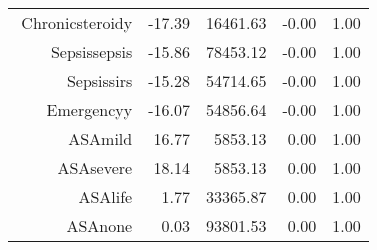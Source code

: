 \begin{tabular}{rrrrr}
$$  Chronic\-steroid\-y & -17.39 & 16461.63 & -0.00 & 1.00 \\ 
  Sepsis\-sepsis & -15.86 & 78453.12 & -0.00 & 1.00 \\ 
  Sepsis\-sirs & -15.28 & 54714.65 & -0.00 & 1.00 \\ 
  Emergency\-y & -16.07 & 54856.64 & -0.00 & 1.00 \\ 
  ASA\-mild & 16.77 & 5853.13 & 0.00 & 1.00 \\ 
  ASA\-severe & 18.14 & 5853.13 & 0.00 & 1.00 \\ 
  ASA\-life & 1.77 & 33365.87 & 0.00 & 1.00 \\ 
  ASA\-none & 0.03 & 93801.53 & 0.00 & 1.00 \\ 
   \hline
\end{tabular}


